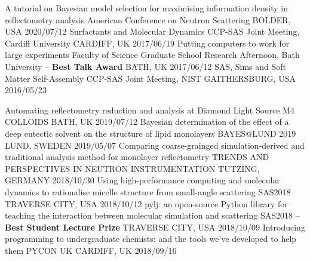 \vspace{-0.4cm}
\begin{cvhonors}
  \cvhonor
    {A tutorial on Bayesian model selection for maximising information density in reflectometry analysis}
    {American Conference on Neutron Scattering}
    {BOLDER, USA}
    {2020/07/12}
  \cvhonor
    {Surfactants and Molecular Dynamics}
    {CCP-SAS Joint Meeting, Cardiff University}
    {CARDIFF, UK}
    {2017/06/19}
  \cvhonor
  	{Putting computers to work for large experiments}
    {Faculty of Science Graduate School Research Afternoon, Bath University -- \textbf{Best Talk Award}}
    {BATH, UK}
    {2017/06/12}
  \cvhonor
    {SAS, Sims and Soft Matter Self-Assembly}
    {CCP-SAS Joint Meeting, NIST}
    {GAITHERSBURG, USA}
    {2016/05/23}
\end{cvhonors}
\begin{cvhonors}
  \cvhonor
    {Automating reflectometry reduction and analysis at Diamond Light Source}
    {M4 COLLOIDS}
    {BATH, UK}
    {2019/07/12}
  \cvhonor
    {Bayesian determination of the effect of a deep eutectic solvent on the structure of lipid monolayers}
    {BAYES@LUND 2019}
    {LUND, SWEDEN}
    {2019/05/07}
  \cvhonor
    {Comparing coarse-grainged simulation-derived and traditional analysis method for monolayer reflectometry}
    {TRENDS AND PERSPECTIVES IN NEUTRON INSTRUMENTATION}
    {TUTZING, GERMANY}
    {2018/10/30}
  \cvhonor
    {Using high-performance computing and molecular dynamics to rationalise micelle structure from small-angle scattering}
    {SAS2018}
    {TRAVERSE CITY, USA}
    {2018/10/12}
  \cvhonor
    {pylj: an open-source Python library for teaching the interaction between molecular simulation and scattering}
	{SAS2018 -- \textbf{Best Student Lecture Prize}}
    {TRAVERSE CITY, USA}
    {2018/10/09}
  \cvhonor
    {Introducing programming to undergraduate chemists: and the tools we've developed to help them}
    {PYCON UK}
    {CARDIFF, UK}
    {2018/09/16}
\end{cvhonors}
